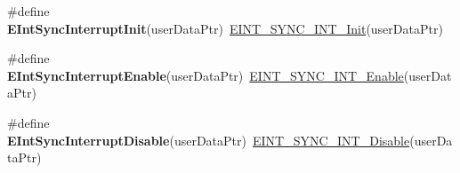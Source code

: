 \begin{DoxyCompactItemize}
\item 
\hypertarget{group___func_ala_ga71166855c962bcadf735b33c1a192118}{\#define {\bfseries E\-Int\-Sync\-Interrupt\-Init}(user\-Data\-Ptr)~\hyperlink{group___e_i_n_t___s_y_n_c___i_n_t__module_ga147d2662135bdc1fb7f7478a421933a4}{E\-I\-N\-T\-\_\-\-S\-Y\-N\-C\-\_\-\-I\-N\-T\-\_\-\-Init}(user\-Data\-Ptr)}\label{group___func_ala_ga71166855c962bcadf735b33c1a192118}

\item 
\hypertarget{group___func_ala_ga45c8d2f800dda48b6b1ca95d5bcbfccc}{\#define {\bfseries E\-Int\-Sync\-Interrupt\-Enable}(user\-Data\-Ptr)~\hyperlink{group___e_i_n_t___s_y_n_c___i_n_t__module_ga4f53d72cded9bef1cf324a2092bdc661}{E\-I\-N\-T\-\_\-\-S\-Y\-N\-C\-\_\-\-I\-N\-T\-\_\-\-Enable}(user\-Data\-Ptr)}\label{group___func_ala_ga45c8d2f800dda48b6b1ca95d5bcbfccc}

\item 
\hypertarget{group___func_ala_ga7581c57d9ce208f1e5421028453293da}{\#define {\bfseries E\-Int\-Sync\-Interrupt\-Disable}(user\-Data\-Ptr)~\hyperlink{group___e_i_n_t___s_y_n_c___i_n_t__module_ga436aa71d065e7db366bafdeb4f3ba1a4}{E\-I\-N\-T\-\_\-\-S\-Y\-N\-C\-\_\-\-I\-N\-T\-\_\-\-Disable}(user\-Data\-Ptr)}\label{group___func_ala_ga7581c57d9ce208f1e5421028453293da}

\end{DoxyCompactItemize}
